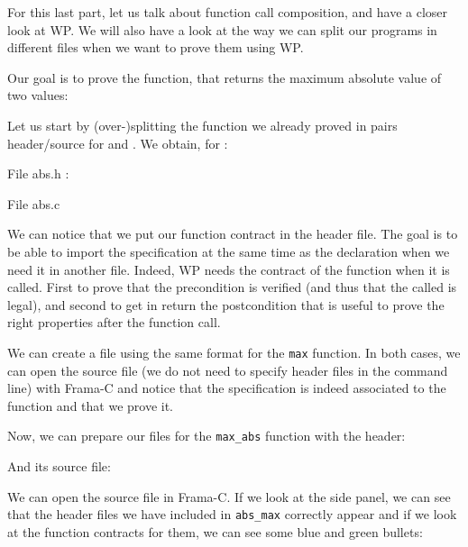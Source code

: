 For this last part, let us talk about function call composition,
and have a closer look at WP. We will also have a look at the way we can split
our programs in different files when we want to prove them using WP.

Our goal is to prove the  function, that returns
the maximum absolute value of two values:






Let us start by (over-)splitting the function we already proved in pairs
header/source for  and . We obtain, for
:



File abs.h :




File abs.c




We can notice that we put our function contract in the header file.
The goal is to be able to import the specification at the same time as
the declaration when we need it in another file. Indeed, WP needs the
contract of the function when it is called. First to prove that the
precondition is verified (and thus that the called is legal), and second
to get in return the postcondition that is useful to prove the right
properties after the function call.

We can create a file using the same format for the \texttt{max}
function. In both cases, we can open the source file (we do not need to
specify header files in the command line) with Frama-C and notice that
the specification is indeed associated to the function and that we prove
it.


Now, we can prepare our files for the \texttt{max\_abs} function with
the header:






And its source file:






We can open the source file in Frama-C. If we look at the side panel, we
can see that the header files we have included in \texttt{abs\_max}
correctly appear and if we look at the function contracts for them, we
can see some blue and green bullets:




